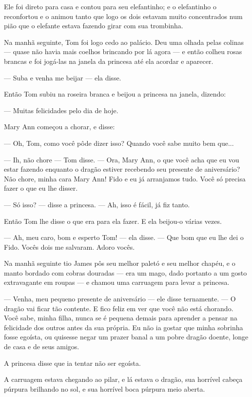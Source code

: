 Ele foi direto para casa e contou para seu elefantinho; e o
elefantinho o reconfortou e o animou tanto que logo os dois estavam
muito concentrados num pião que o elefante estava fazendo girar com
sua trombinha.

Na manhã seguinte, Tom foi logo cedo ao palácio. Deu uma olhada pelas
colinas — quase não havia mais coelhos brincando por lá agora — e
então colheu rosas brancas e foi jogá-las na janela da princesa até
ela acordar e aparecer.

— Suba e venha me beijar — ela disse.

Então Tom subiu na roseira branca e beijou a princesa na janela,
dizendo:

— Muitas felicidades pelo dia de hoje.

Mary Ann começou a chorar, e disse:

— Oh, Tom, como você pôde dizer isso? Quando você sabe muito bem
que...

— Ih, não chore — Tom disse. — Ora, Mary Ann, o que você acha que eu
vou estar fazendo enquanto o dragão estiver recebendo seu presente de
aniversário? Não chore, minha cara Mary Ann! Fido e eu já arranjamos
tudo. Você só precisa fazer o que eu lhe disser.

— Só isso? — disse a princesa. — Ah, isso é fácil, já fiz tanto.

Então Tom lhe disse o que era para ela fazer. E ela beijou-o várias
vezes.

— Ah, meu caro, bom e esperto Tom! — ela disse. — Que bom que eu lhe
dei o Fido. Vocês dois me salvaram. Adoro vocês.

Na manhã seguinte tio James pôs seu melhor paletó e seu melhor chapéu,
e o manto bordado com cobras douradas — era um mago, dado portanto a
um gosto extravagante em roupas — e chamou uma carruagem para levar a
princesa.

— Venha, meu pequeno presente de aniversário — ele disse ternamente. —
O dragão vai ficar tão contente. E fico feliz em ver que você não
está chorando. Você sabe, minha filha, nunca se é pequena demais para
aprender a pensar na felicidade dos outros antes da sua própria. Eu
não ia gostar que minha sobrinha fosse egoísta, ou quisesse negar um
prazer banal a um pobre dragão doente, longe de casa e de seus
amigos.

A princesa disse que ia tentar não ser egoísta.

A carruagem estava chegando ao pilar, e lá estava o dragão, sua
horrível cabeça púrpura brilhando no sol, e sua horrível boca púrpura
meio aberta.

